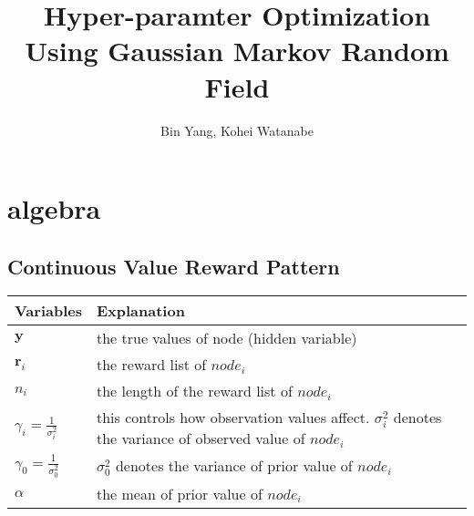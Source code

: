 \documentclass[platex, a4paper]{jsarticle}
\begin{document}
\title{Hyper-paramter Optimization \\ Using Gaussian Markov Random Field}
\author{Bin Yang, Kohei Watanabe}
\maketitle

\section{algebra}

\subsection{Continuous Value Reward Pattern}

\begin{table}[htb]
\begin{tabular}{ll} \toprule
Variables & Explanation \\ \toprule
$\bm{y}$ & the true values of node (hidden variable) \\
$\bm{r}_i$ & the reward list of $node_i$ \\
$n_i$ & the length of the reward list of $node_i$ \\
$\gamma_i=\frac{1}{\sigma_i^2}$ & this controls how observation values affect. $\sigma_i^2$ denotes the variance of observed value of $node_i$ \\
$\gamma_0=\frac{1}{\sigma_0^2}$ & $\sigma_0^2$ denotes the variance of prior value of $node_i$ \\
$\alpha$ & the mean of prior value of $node_i$ \\ \bottomrule
\end{tabular}
\end{table}
\end{document}
